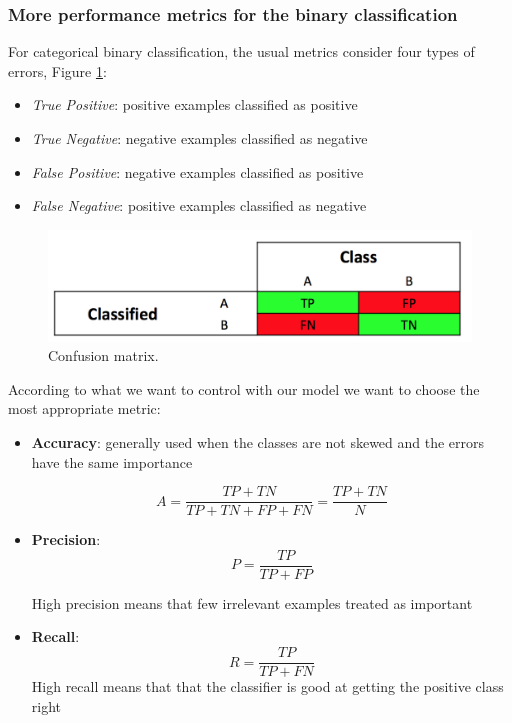 \subsubsection{More performance metrics for the binary classification}
\label{sec:perf}

For categorical binary classification, the usual metrics consider four types of errors, Figure \ref{pic:confusion_matrix}:

\begin{itemize}
\item \emph{True Positive}: positive examples classified as positive
\item \emph{True Negative}: negative examples classified as negative
\item \emph{False Positive}: negative examples classified as positive
\item \emph{False Negative}: positive examples classified as negative
\end{itemize}

\begin{figure}[H]%
 \centering
 \includegraphics[width=13cm]{./img/08/confusion_matrix}
 \caption{\label{pic:confusion_matrix} Confusion matrix.}
\end{figure}

According to what we want to control with our model we want to choose the most appropriate metric:
\begin{itemize}
\item \textbf{Accuracy}: generally used when the classes are not skewed
and the errors have the same importance

$$A = \frac{TP+TN}{TP+TN+FP+FN} =  \frac{TP+TN}{N}$$

\item \textbf{Precision}: 
$$P = \frac{TP}{TP+FP}$$

High precision means that few irrelevant examples treated as important 
\item \textbf{Recall}: 
$$	R = \frac{TP}{TP+FN}$$
High recall means that that the classifier is good at getting the positive class right
\end{itemize}

